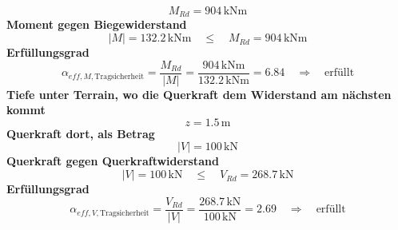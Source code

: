 \documentclass[11pt,a4paper]{article}
\begin{document}
\begin{equation*}
M_{Rd} = 904\,\mathrm{kNm}
\end{equation*}
\noindent\textbf{Moment gegen Biegewiderstand}
\begin{equation*}
\left|M\right| = 132.2\,\mathrm{kNm} \quad \le \quad M_{Rd} = 904\,\mathrm{kNm}
\end{equation*}
\noindent\textbf{Erfüllungsgrad}
\begin{equation*}
\alpha_{eff,M,\text{Tragsicherheit}} = \frac{M_{Rd}}{\left|M\right|} = \frac{904\,\mathrm{kNm}}{132.2\,\mathrm{kNm}} = 6.84 \quad \Rightarrow \quad \text{erfüllt}
\end{equation*}
\noindent\textbf{Tiefe unter Terrain, wo die Querkraft dem Widerstand am nächsten kommt}
\begin{equation*}
z = 1.5\,\mathrm{m}
\end{equation*}
\noindent\textbf{Querkraft dort, als Betrag}
\begin{equation*}
\left|V\right| = 100\,\mathrm{kN}
\end{equation*}
\noindent\textbf{Querkraft gegen Querkraftwiderstand}
\begin{equation*}
\left|V\right| = 100\,\mathrm{kN} \quad \le \quad V_{Rd} = 268.7\,\mathrm{kN}
\end{equation*}
\noindent\textbf{Erfüllungsgrad}
\begin{equation*}
\alpha_{eff,V,\text{Tragsicherheit}} = \frac{V_{Rd}}{\left|V\right|} = \frac{268.7\,\mathrm{kN}}{100\,\mathrm{kN}} = 2.69 \quad \Rightarrow \quad \text{erfüllt}
\end{equation*}
\end{document}
